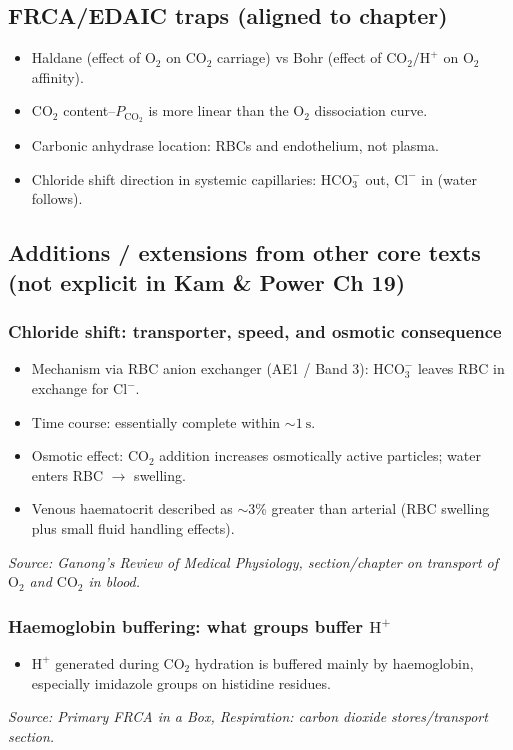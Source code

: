 \documentclass[11pt,a4paper]{article}
\begin{document}
\subsection{FRCA/EDAIC traps (aligned to chapter)}
\begin{itemize}
  \item Haldane (effect of \(\mathrm{O_2}\) on \(\mathrm{CO_2}\) carriage) vs Bohr (effect of \(\mathrm{CO_2/H^+}\) on \(\mathrm{O_2}\) affinity).
  \item \(\mathrm{CO_2}\) content--\(P_{\mathrm{CO_2}}\) is more linear than the \(\mathrm{O_2}\) dissociation curve.
  \item Carbonic anhydrase location: RBCs and endothelium, not plasma.
  \item Chloride shift direction in systemic capillaries: \(\mathrm{HCO_3^-}\) out, \(\mathrm{Cl^-}\) in (water follows).
\end{itemize}

\subsection{Additions / extensions from other core texts (not explicit in Kam \& Power Ch 19)}
\subsubsection{Chloride shift: transporter, speed, and osmotic consequence}
\begin{itemize}
  \item Mechanism via RBC anion exchanger (AE1 / Band 3): \(\mathrm{HCO_3^-}\) leaves RBC in exchange for \(\mathrm{Cl^-}\).
  \item Time course: essentially complete within \(\sim 1~\mathrm{s}\).
  \item Osmotic effect: \(\mathrm{CO_2}\) addition increases osmotically active particles; water enters RBC \(\rightarrow\) swelling.
  \item Venous haematocrit described as \(\sim 3\%\) greater than arterial (RBC swelling plus small fluid handling effects).
\end{itemize}
\textit{Source: Ganong’s Review of Medical Physiology, section/chapter on transport of \(\mathrm{O_2}\) and \(\mathrm{CO_2}\) in blood.}

\subsubsection{Haemoglobin buffering: what groups buffer \(\mathrm{H^+}\)}
\begin{itemize}
  \item \(\mathrm{H^+}\) generated during \(\mathrm{CO_2}\) hydration is buffered mainly by haemoglobin, especially imidazole groups on histidine residues.
\end{itemize}
\textit{Source: Primary FRCA in a Box, Respiration: carbon dioxide stores/transport section.}
\end{document}
